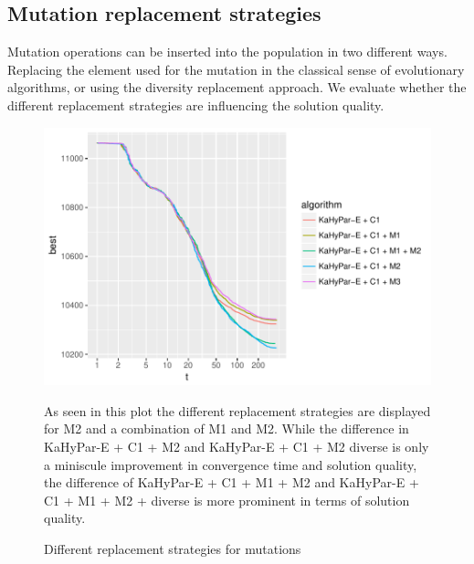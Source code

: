 \documentclass[a4paper,12pt,titlepage, BCOR7mm,headsepline]{scrbook}
\numberwithin{equation}{section}
\begin{document}

\subsection{Mutation replacement strategies}


Mutation operations can be inserted into the population in two different ways. Replacing the element used for the mutation in the classical sense of evolutionary algorithms, or using the diversity replacement approach. We evaluate whether the different replacement strategies are influencing the solution quality.
\begin{figure}[H]
\caption{Different replacement strategies for mutations}
\begin{center}
\includegraphics{bachelorarbeit-differentoperatos}

\end{center}
As seen in this plot the different replacement strategies are displayed for M2 and a combination of M1 and M2. While the difference in KaHyPar-E + C1 + M2 and KaHyPar-E + C1 + M2 diverse is only a miniscule improvement in convergence time and solution quality, the difference of KaHyPar-E + C1 + M1 + M2 and KaHyPar-E + C1 + M1 + M2 + diverse is more prominent in terms of solution quality.

\end{figure}
\end{document}
